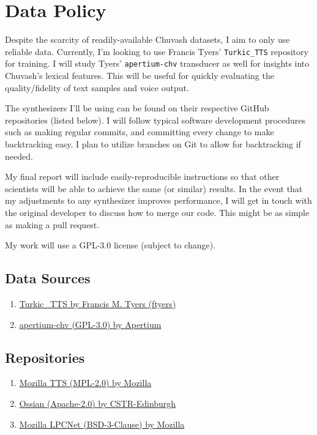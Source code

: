 \documentclass[fleqn,10pt]{SelfArx} %
\begin{document}
	\section{Data Policy}
	Despite the scarcity of readily-available Chuvash datasets, I aim to only use reliable data. Currently, I'm looking to use Francis Tyers' \texttt{Turkic\_TTS} repository for training. I will study Tyers' \texttt{apertium-chv} transducer as well for insights into Chuvash's lexical features. This will be useful for quickly evaluating the quality/fidelity of text samples and voice output.
	
	The synthesizers I'll be using can be found on their respective GitHub repositories (listed below). I will follow typical software development procedures such as making regular commits, and committing every change to make backtracking easy. I plan to utilize branches on Git to allow for backtracking if needed.
	
	My final report will include easily-reproducible instructions so that other scientists will be able to achieve the same (or similar) results. In the event that my adjustments to any synthesizer improves performance, I will get in touch with the original developer to discuss how to merge our code. This might be as simple as making a pull request.
	
	My work will use a GPL-3.0 license (subject to change).
	
	\subsection{Data Sources}
	\begin{enumerate}
		\item \href{https://github.com/ftyers/Turkic_TTS}{\underline{Turkic\_TTS} by Francis M. Tyers (ftyers)}
		\item \href{https://github.com/apertium/apertium-chv}{\underline{apertium-chv} (GPL-3.0) by Apertium}
	\end{enumerate}
	
	\subsection{Repositories}
	\begin{enumerate}
		\item \href{https://github.com/mozilla/TTS}{\underline{Mozilla TTS} (MPL-2.0) by Mozilla}
		\item \href{https://github.com/CSTR-Edinburgh/Ossian}{\underline{Ossian} (Apache-2.0) by CSTR-Edinburgh}
		\item \href{https://github.com/mozilla/LPCNet}{\underline{Mozilla LPCNet} (BSD-3-Clause) by Mozilla}
	\end{enumerate}
\end{document}
